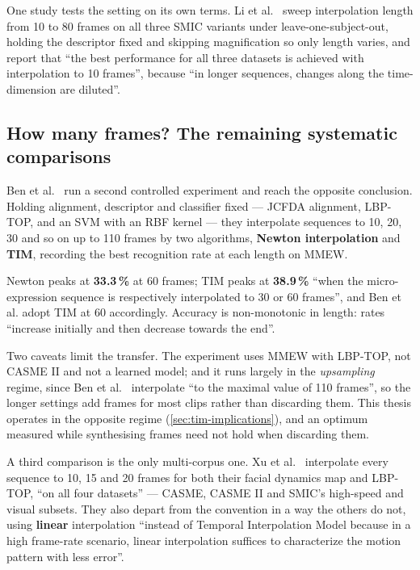 One study tests the setting on its own terms. Li et al.~\cite{liX2018} sweep interpolation length from 10 to 80 frames on all three SMIC variants under leave-one-subject-out, holding the descriptor fixed and skipping magnification so only length varies, and report that ``the best performance for all three datasets is achieved with interpolation to 10 frames'', because ``in longer sequences, changes along the time-dimension are diluted''.

\subsection{How many frames? The remaining systematic comparisons}
\label{sec:tim-how-many}

Ben et al.~\cite{ben2021} run a second controlled experiment and reach the opposite conclusion. Holding alignment, descriptor and classifier fixed --- JCFDA alignment, LBP-TOP, and an SVM with an RBF kernel --- they interpolate sequences to 10, 20, 30 and so on up to 110 frames by two algorithms, \textbf{Newton interpolation} and \textbf{TIM}, recording the best recognition rate at each length on MMEW.

Newton peaks at \textbf{33.3\,\%} at 60 frames; TIM peaks at \textbf{38.9\,\%} ``when the micro-expression sequence is respectively interpolated to 30 or 60 frames'', and Ben et al. adopt TIM at 60 accordingly. Accuracy is non-monotonic in length: rates ``increase initially and then decrease towards the end''.

Two caveats limit the transfer. The experiment uses MMEW with LBP-TOP, not CASME II and not a learned model; and it runs largely in the \textit{upsampling} regime, since Ben et al.~\cite{ben2021} interpolate ``to the maximal value of 110 frames'', so the longer settings add frames for most clips rather than discarding them. This thesis operates in the opposite regime (\autoref{sec:tim-implications}), and an optimum measured while synthesising frames need not hold when discarding them.

A third comparison is the only multi-corpus one. Xu et al.~\cite{xu2017} interpolate every sequence to 10, 15 and 20 frames for both their facial dynamics map and LBP-TOP, ``on all four datasets'' --- CASME, CASME II and SMIC's high-speed and visual subsets. They also depart from the convention in a way the others do not, using \textbf{linear} interpolation ``instead of Temporal Interpolation Model because in a high frame-rate scenario, linear interpolation suffices to characterize the motion pattern with less error''.

